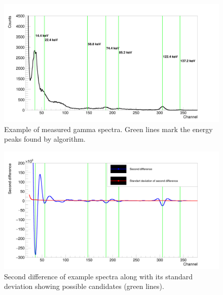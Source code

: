 \begin{figure}[H]
 \centering
 \includegraphics[scale=0.105, angle = 0]{./pictures/DataGraph.png}
 \caption{Example of measured gamma spectra. Green lines mark the energy peaks found by algorithm.}
 \label{Example}
 
\end{figure}

\begin{figure}[H]
 \centering
 \includegraphics[scale=0.105, angle = 0]{./pictures/SecondDerivGraph.png}
 \caption{Second difference of example spectra along with its standard deviation showing possible candidates (green lines).}
 \label{secondDerivative}
 
\end{figure}


